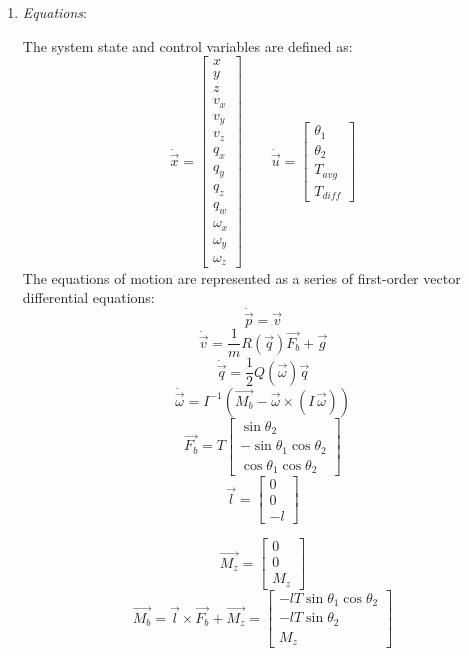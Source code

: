\documentclass[]{article}
\begin{document}
	\begin{enumerate}
	\item {\em Equations}:
	
	The system state and control variables are defined as:
        \[
        \dot{\vec{x}} =
        \begin{bmatrix}
        x \\ y \\ z \\ v_x \\ v_y \\ v_z \\ q_x \\ q_y \\ q_z \\ q_w \\ \omega_x \\ \omega_y \\ \omega_z
        \end{bmatrix}
        \qquad
        \dot{\vec{u}} =
        \begin{bmatrix}
        \theta_1 \\ \theta_2 \\ T_{avg} \\ T_{diff}
        \end{bmatrix}
        \]
        The equations of motion are represented as a series of first-order vector differential equations:
        	\[
		\dot{\vec{p}} = \vec{v}
	\]
	\[
		\dot{\vec{v}} = \frac{1}{m}R(\vec{q})\vec{F_b}+\vec{g}
	\]
	\[
		\dot{\vec{q}} = \frac{1}{2}Q(\vec{\omega})\vec{q}
	\]
	\[
		\dot{\vec{\omega}} = I^{-1}\!\left(\vec{M_b} - \vec{\omega} \times (I\,\vec{\omega})\right)
	\]
	 \[
         \vec{F_b} = T
        \begin{bmatrix}
        \sin{\theta_2}  \\
         -\sin{\theta_1}\cos{\theta_2}  \\
         \cos{\theta_1}\cos{\theta_2}
        \end{bmatrix}
        \]
        \[
	\vec{l} =
        \begin{bmatrix}
        0  \\
        0  \\
        -l
        \end{bmatrix}
        \]
        
        \[
	\vec{M_z} =
        \begin{bmatrix}
        0  \\
        0  \\
        M_z
        \end{bmatrix}
        \]
        	 \[
        \vec{M_b} = \vec{l} \times \vec{F_b} + \vec{M_z}=       
        \begin{bmatrix}
        -lT\sin{\theta_1}\cos{\theta_2}  \\
        -lT\sin{\theta_2}  \\
	M_z
        \end{bmatrix}
        \]
        

\end{enumerate}
\end{document}
